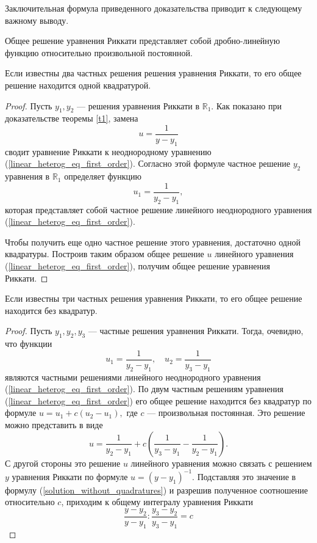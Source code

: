 Заключительная формула приведенного доказательства приводит к следующему важному выводу.
\begin{cons}
    Общее решение уравнения Риккати представляет собой дробно-линейную функцию относительно произвольной постоянной.
\end{cons}

\begin{theorem}
    Если известны два частных решения решения уравнения Риккати, то его общее решение находится одной квадратурой.
\end{theorem}
\begin{proof}
    Пусть $y_1, y_2$ --- решения уравнения Риккати в $\mathbb{R}_1$. Как показано при доказательстве теоремы \ref{t1}, замена
    \begin{equation} \label{u_subst}
        u = \dfrac{1}{y - y_1}
    \end{equation}
    сводит уравнение Риккати к неоднородному уравнению (\ref{linear_heterog_eq_first_order}). Согласно этой формуле частное решение $y_2$ уравнения в $\mathbb{R}_1$ определяет функцию
    \begin{equation}
        u_1 = \dfrac{1}{y_2 - y_1},
    \end{equation}
    которая представляет собой частное решение линейного неоднородного уравнения (\ref{linear_heterog_eq_first_order}).

    Чтобы получить еще одно частное решение этого уравнения, достаточно одной квадратуры. Построив таким образом общее решение $u$ линейного уравнения (\ref{linear_heterog_eq_first_order}), получим общее решение уравнения Риккати.
\end{proof}

\begin{theorem}
    Если известны три частных решения уравнения Риккати, то его общее решение находится без квадратур.
\end{theorem}
\begin{proof}
    Пусть $y_1, y_2, y_3$ --- частные решения уравнения Риккати. Тогда, очевидно, что функции
    \begin{equation} \label{u_1_and_u_2}
        u_1 = \dfrac{1}{y_2 - y_1}, \quad u_2 = \dfrac{1}{y_3 - y_1}
    \end{equation}
    являются частными решениями линейного неоднородного уравнения (\ref{linear_heterog_eq_first_order}). По двум частным решениям уравнения (\ref{linear_heterog_eq_first_order}) его общее решение находится без квадратур по формуле $u = u_1 + c (u_2 - u_1),$ где $c$ --- произвольная постоянная. Это решение можно представить в виде
    \begin{equation} \label{solution_without_quadratures}
        u = \dfrac{1}{y_2 - y_1} + c \left( \dfrac{1}{y_3 - y_1} - \dfrac{1}{y_2 - y_1} \right).
    \end{equation}
    С другой стороны это решение $u$ линейного уравнения можно связать с решением $y$ уравнения Риккати по формуле $u = (y - y_1)^{-1}$. Подставляя это значение в формулу (\ref{solution_without_quadratures}) и разрешив полученное соотношение относительно $c$, приходим к общему интегралу уравнения Риккати
    $$\dfrac{y - y_2}{y - y_1} : \dfrac{y_3 - y_2}{y_3 - y_1} = c$$
\end{proof}

